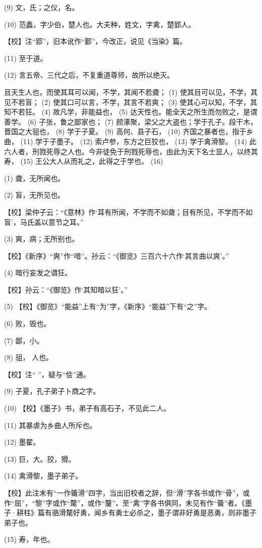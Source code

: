 \documentclass[12pt,UTF8]{ctexbook}
\begin{document}
(9) 文，氏；之仪，名。

(10) 范蠡，字少伯，楚人也。大夫种，姓文，字禽，楚郢人。

【校】注“郢”，旧本讹作“鄞”，今改正，说见《当染》篇。

(11) 至于道。

(12) 言五帝、三代之后，不复重道尊师，故所以绝灭。

且天生人也，而使其耳可以闻，不学，其闻不若聋； (1) 使其目可以见，不学，其见不若盲； (2) 使其口可以言，不学，其言不若爽； (3) 使其心可以知，不学，其知不若狂。 (4) 故凡学，非能益也， (5) 达天性也。能全天之所生而勿败之，是谓善学。 (6) 子张，鲁之鄙家也； (7) 颜涿聚，梁父之大盗也；学于孔子。段干木，晋国之大驵也， (8) 学于子夏。 (9) 高何、县子石， (10) 齐国之暴者也，指于乡曲， (11) 学于子墨子。 (12) 索卢参，东方之巨狡也， (13) 学于禽滑黎。 (14) 此六人者，刑戮死辱之人也。今非徒免于刑戮死辱也，由此为天下名士显人，以终其寿， (15) 王公大人从而礼之，此得之于学也。 (16)

(1) 聋，无所闻也。

(2) 盲，无所见也。

【校】梁仲子云：“《意林》作‘耳有所闻，不学而不如聋；目有所见，不学而不如盲’，马氏盖以意节之耳。”

(3) 爽，病；无所别也。

【校】《新序》“爽”作“喑”。孙云：“《御览》三百六十六作‘其言曲以爽’。”

(4) 暗行妄发之谓狂。

【校】孙云：“《御览》作‘其知暗以狂’。”

(5) 【校】《御览》“能益”上有“为”字，《新序》“能益”下有“之”字。

(6) 败，毁也。

(7) 鄙，小。

(8) 驵， 人也。

【校】注“ ”，疑与“侩”通。

(9) 子夏，孔子弟子卜商之字。

(10) 【校】《墨子》书，弟子有高石子，不见此二人。

(11) 其暴虐为乡曲人所斥也。

(12) 墨翟。

(13) 巨，大。狡，猾。

(14) 禽滑黎，墨子弟子。

【校】此注末有“一作籥滑”四字，当出旧校者之辞，但“滑”字各书或作“骨”，或作“屈”，“黎”字或作“氂”，或作“釐”，至“禽”字各书俱同，未见有作“籥”者。《墨子·耕柱》篇有骆滑氂好勇，闻乡有勇士必杀之，墨子谓非好勇是恶勇，则非墨子弟子也。

(15) 寿，年也。
\end{document}
